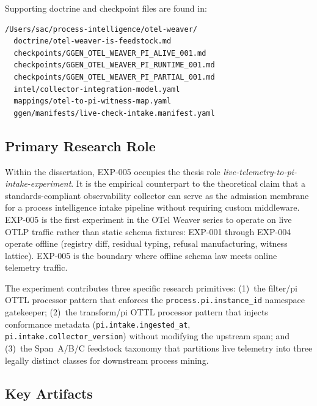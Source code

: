 Supporting doctrine and checkpoint files are found in:
\begin{verbatim}
/Users/sac/process-intelligence/otel-weaver/
  doctrine/otel-weaver-is-feedstock.md
  checkpoints/GGEN_OTEL_WEAVER_PI_ALIVE_001.md
  checkpoints/GGEN_OTEL_WEAVER_PI_RUNTIME_001.md
  checkpoints/GGEN_OTEL_WEAVER_PI_PARTIAL_001.md
  intel/collector-integration-model.yaml
  mappings/otel-to-pi-witness-map.yaml
  ggen/manifests/live-check-intake.manifest.yaml
\end{verbatim}

\subsection{Primary Research Role}
\label{sec:otel-weaver-exp-005-collector-to-intake-identity-role}

Within the dissertation, EXP-005 occupies the thesis role
\textit{live-telemetry-to-pi-intake-experiment}. It is the empirical counterpart to the
theoretical claim that a standards-compliant observability collector can serve as the
admission membrane for a process intelligence intake pipeline without requiring custom
middleware. EXP-005 is the first experiment in the OTel Weaver series to operate on live
OTLP traffic rather than static schema fixtures: EXP-001 through EXP-004 operate offline
(registry diff, residual typing, refusal manufacturing, witness lattice). EXP-005 is the
boundary where offline schema law meets online telemetry traffic.

The experiment contributes three specific research primitives: (1)~the filter/pi OTTL
processor pattern that enforces the \texttt{process.pi.instance\_id} namespace gatekeeper;
(2)~the transform/pi OTTL processor pattern that injects conformance metadata
(\texttt{pi.intake.ingested\_at}, \texttt{pi.intake.collector\_version}) without modifying
the upstream span; and (3)~the Span~A/B/C feedstock taxonomy that partitions live telemetry
into three legally distinct classes for downstream process mining.

\subsection{Key Artifacts}
\label{sec:otel-weaver-exp-005-collector-to-intake-identity-artifacts}

